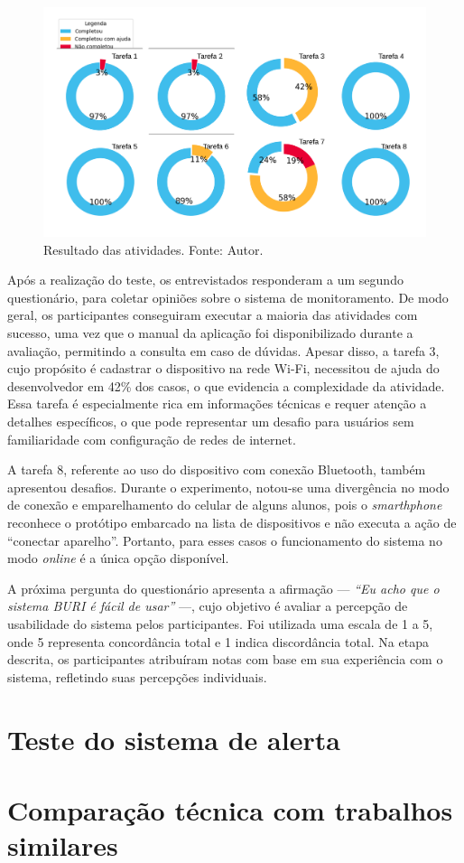 \begin{figure}[ht]
    \centering
    \includegraphics[width=.94\textwidth]{img/questionario/1/graf-atividades-resultado.png}
    \caption{Resultado das atividades. Fonte: Autor.}\label{grafAtvResultado}
\end{figure}

Após a realização do teste, os entrevistados responderam a um segundo questionário, para coletar opiniões sobre o 
sistema de monitoramento. De modo geral, os participantes conseguiram executar a maioria das atividades com sucesso, uma vez que o manual 
da aplicação foi disponibilizado durante a avaliação, permitindo a consulta em caso de dúvidas. Apesar disso, a tarefa 3, cujo propósito é cadastrar o dispositivo na 
rede Wi-Fi, necessitou de ajuda do desenvolvedor em 42\% dos casos, o que evidencia a complexidade da atividade. Essa tarefa é especialmente rica em 
informações técnicas e requer atenção a detalhes específicos, o que pode representar um desafio para usuários sem familiaridade com configuração de redes de internet.

A tarefa 8, referente ao uso do dispositivo com conexão Bluetooth, também apresentou desafios. Durante o experimento, notou-se uma divergência 
no modo de conexão e emparelhamento do celular de alguns alunos, pois o \textit{smarthphone} reconhece o protótipo embarcado na lista de dispositivos e não executa a ação de ``conectar aparelho''. Portanto, para 
esses casos o funcionamento do sistema no modo \textit{online} é a única opção disponível. 

A próxima pergunta do questionário apresenta a afirmação — \textit{``Eu acho que o sistema BURI é fácil de usar''} —, cujo objetivo é avaliar a percepção de usabilidade do sistema pelos participantes. Foi utilizada 
uma escala de 1 a 5, onde 5 representa concordância total e 1 indica discordância total. Na etapa descrita, os participantes atribuíram notas com base em sua experiência com o sistema, refletindo suas percepções individuais.

\section{Teste do sistema de alerta}\label{alerta}

\section{Comparação técnica com trabalhos similares}\label{comparacao}